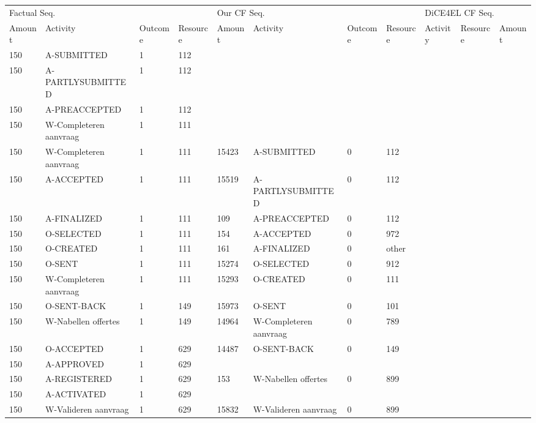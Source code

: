 \begin{tabular}{lllllllllll}
\toprule
\multicolumn{4}{l}{Factual Seq.} & \multicolumn{4}{l}{Our CF Seq.} & \multicolumn{3}{l}{DiCE4EL CF Seq.} \\
Amount & Activity & Outcome & Resource & Amount & Activity & Outcome & Resource & Activity & Resource & Amount \\
\midrule
150 & A-SUBMITTED & 1 & 112 &  &  &  &  &  &  &  \\
150 & A-PARTLYSUBMITTED & 1 & 112 &  &  &  &  &  &  &  \\
150 & A-PREACCEPTED & 1 & 112 &  &  &  &  &  &  &  \\
150 & W-Completeren aanvraag & 1 & 111 &  &  &  &  &  &  &  \\
150 & W-Completeren aanvraag & 1 & 111 & 15423 & A-SUBMITTED & 0 & 112 &  &  &  \\
150 & A-ACCEPTED & 1 & 111 & 15519 & A-PARTLYSUBMITTED & 0 & 112 &  &  &  \\
150 & A-FINALIZED & 1 & 111 & 109 & A-PREACCEPTED & 0 & 112 &  &  &  \\
150 & O-SELECTED & 1 & 111 & 154 & A-ACCEPTED & 0 & 972 &  &  &  \\
150 & O-CREATED & 1 & 111 & 161 & A-FINALIZED & 0 & other &  &  &  \\
150 & O-SENT & 1 & 111 & 15274 & O-SELECTED & 0 & 912 &  &  &  \\
150 & W-Completeren aanvraag & 1 & 111 & 15293 & O-CREATED & 0 & 111 &  &  &  \\
150 & O-SENT-BACK & 1 & 149 & 15973 & O-SENT & 0 & 101 &  &  &  \\
150 & W-Nabellen offertes & 1 & 149 & 14964 & W-Completeren aanvraag & 0 & 789 &  &  &  \\
150 & O-ACCEPTED & 1 & 629 & 14487 & O-SENT-BACK & 0 & 149 &  &  &  \\
150 & A-APPROVED & 1 & 629 &  &  &  &  &  &  &  \\
150 & A-REGISTERED & 1 & 629 & 153 & W-Nabellen offertes & 0 & 899 &  &  &  \\
150 & A-ACTIVATED & 1 & 629 &  &  &  &  &  &  &  \\
150 & W-Valideren aanvraag & 1 & 629 & 15832 & W-Valideren aanvraag & 0 & 899 &  &  &  \\
\bottomrule
\end{tabular}
